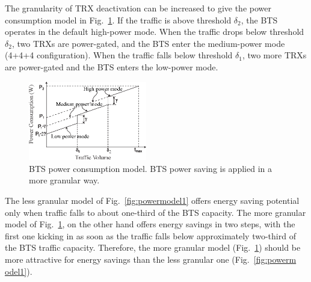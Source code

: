 The granularity of TRX deactivation can be increased to give the power consumption model in Fig.~\ref{fig:powermodel2}. If the traffic is above threshold $\delta_2$, the BTS operates in the default high-power mode. When the traffic drops below threshold $\delta_2$, two TRXs are power-gated, and the BTS enter the medium-power mode (4+4+4 configuration). When the traffic falls below threshold $\delta_1$, two more TRXs are power-gated and the BTS enters the low-power mode.

\begin{figure}
\centering
\includegraphics[width=0.46\textwidth]{figures/powermodel2.eps}
\caption{BTS power consumption model. BTS power saving is applied in a more granular way.}
\label{fig:powermodel2}
\end{figure}

The less granular model of Fig.~\ref{fig:powermodel1} offers energy saving potential only when traffic falls to about one-third of the BTS capacity. The more granular model of Fig.~\ref{fig:powermodel2}, on the other hand offers energy savings in two steps, with the first one kicking in as soon as the traffic falls below approximately two-third of the BTS traffic capacity. Therefore, the more granular model (Fig.~\ref{fig:powermodel2}) should be more attractive for energy savings than the less granular one (Fig.~\ref{fig:powerm odel1}).

